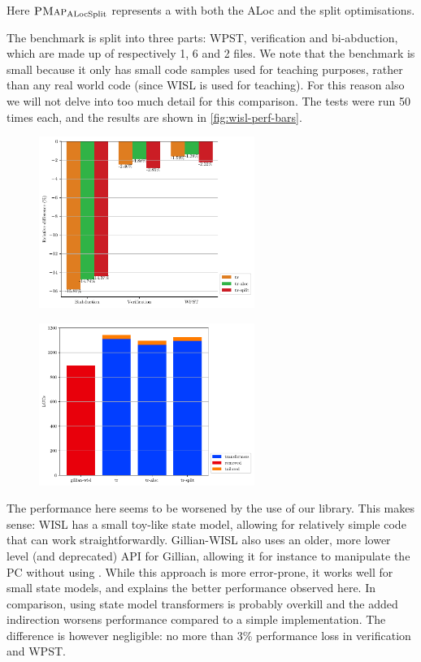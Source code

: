 Here $\textsc{PMap}_{\text{ALocSplit}}$ represents a \PMap{} with both the ALoc and the split optimisations.

The benchmark is split into three parts: WPST, verification and bi-abduction, which are made up of respectively 1, 6 and 2 files. We note that the benchmark is small because it only has small code samples used for teaching purposes, rather than any real world code (since WISL is used for teaching). For this reason also we will not delve into too much detail for this comparison. The tests were run 50 times each, and the results are shown in \autoref{fig:wisl-perf-bars}.

\begin{figure}
\captionsetup{width=.4\linewidth}
\centering
\begin{minipage}[t]{.45\textwidth}
	\centering
	\includegraphics[width=7cm]{figures/wisl/avg_mode_relative_diff.pdf}
	\label{fig:wisl-perf-bars}
\end{minipage}\hfill%
\begin{minipage}[t]{.45\textwidth}
	\centering
	\includegraphics[width=7cm]{figures/wisl/locs.pdf}
	\label{fig:wisl-locs}
\end{minipage}%
\end{figure}

The performance here seems to be worsened by the use of our library. This makes sense: WISL has a small toy-like state model, allowing for relatively simple code that can work straightforwardly. Gillian-WISL also uses an older, more lower level (and deprecated) API for Gillian, allowing it for instance to manipulate the PC without using . While this approach is more error-prone, it works well for small state models, and explains the better performance observed here. In comparison, using state model transformers is probably overkill and the added indirection worsens performance compared to a simple implementation. The difference is however negligible: no more than 3\% performance loss in verification and WPST.

